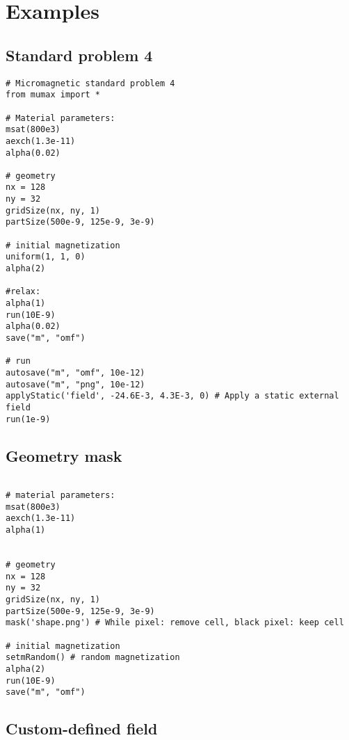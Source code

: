 \section{Examples}

\subsection{Standard problem 4}

\begin{verbatim}
# Micromagnetic standard problem 4
from mumax import *

# Material parameters:
msat(800e3)   
aexch(1.3e-11)     
alpha(0.02)

# geometry 
nx = 128
ny = 32
gridSize(nx, ny, 1)    
partSize(500e-9, 125e-9, 3e-9)

# initial magnetization
uniform(1, 1, 0)
alpha(2)

#relax:
alpha(1)
run(10E-9)
alpha(0.02)
save("m", "omf")

# run
autosave("m", "omf", 10e-12)
autosave("m", "png", 10e-12)
applyStatic('field', -24.6E-3, 4.3E-3, 0) # Apply a static external field
run(1e-9)
\end{verbatim}



\subsection{Geometry mask}

\begin{verbatim}

# material parameters:
msat(800e3)   
aexch(1.3e-11)     
alpha(1)


# geometry 
nx = 128
ny = 32
gridSize(nx, ny, 1)    
partSize(500e-9, 125e-9, 3e-9)
mask('shape.png') # While pixel: remove cell, black pixel: keep cell

# initial magnetization
setmRandom() # random magnetization
alpha(2)
run(10E-9)
save("m", "omf")

\end{verbatim}

\subsection{Custom-defined field}


